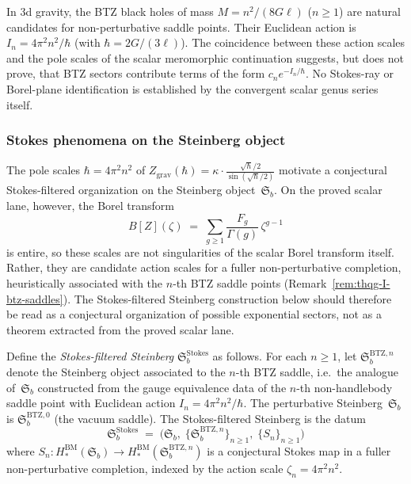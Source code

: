 \begin{remark}
\label{rem:thqg-I-btz-saddles}
In 3d gravity, the BTZ black holes of mass $M = n^2/(8G\ell)$ ($n \geq 1$) are natural candidates for non-perturbative saddle points. Their Euclidean action is $I_n = 4\pi^2 n^2 / \hbar$ (with $\hbar = 2G/(3\ell)$). The coincidence between these action scales and the pole scales of the scalar meromorphic continuation suggests, but does not prove, that BTZ sectors contribute terms of the form $c_n e^{-I_n/\hbar}$. No Stokes-ray or Borel-plane identification is established by the convergent scalar genus series itself.
\end{remark}

\providecommand{\SteinbergB}{\mathfrak{S}_b}

\subsubsection{Stokes phenomena on the Steinberg object}

The pole scales $\hbar = 4\pi^2 n^2$ of
$Z_{\mathrm{grav}}(\hbar) = \kappa \cdot \frac{\sqrt{\hbar}/2}{\sin(\sqrt{\hbar}/2)}$
motivate a conjectural Stokes-filtered organization on the
Steinberg object~$\SteinbergB$. On the proved scalar lane, however,
the Borel transform
\[
B[Z](\zeta) \;=\; \sum_{g \geq 1} \frac{F_g}{\Gamma(g)}\,\zeta^{g-1}
\]
is entire, so these scales are not singularities of the scalar Borel
transform itself. Rather, they are candidate action scales for a
fuller non-perturbative completion, heuristically associated with the
$n$-th BTZ saddle points (Remark~\ref{rem:thqg-I-btz-saddles}).
The Stokes-filtered Steinberg construction below should therefore be
read as a conjectural organization of possible exponential sectors,
not as a theorem extracted from the proved scalar lane.

\begin{construction}
Define the \emph{Stokes-filtered Steinberg} $\SteinbergB^{\mathrm{Stokes}}$ as follows. For each $n \geq 1$, let $\SteinbergB^{\mathrm{BTZ},n}$ denote the Steinberg object associated to the $n$-th BTZ saddle, i.e.\ the analogue of~$\SteinbergB$ constructed from the gauge equivalence data of the $n$-th non-handlebody saddle point with Euclidean action $I_n = 4\pi^2 n^2 / \hbar$. The perturbative Steinberg~$\SteinbergB$ is $\SteinbergB^{\mathrm{BTZ},0}$ (the vacuum saddle). The Stokes-filtered Steinberg is the datum
\[
\SteinbergB^{\mathrm{Stokes}} \;=\; \bigl(\SteinbergB,\;\{\SteinbergB^{\mathrm{BTZ},n}\}_{n \geq 1},\;\{S_n\}_{n \geq 1}\bigr)
\]
where $S_n \colon H_*^{\mathrm{BM}}(\SteinbergB) \to H_*^{\mathrm{BM}}(\SteinbergB^{\mathrm{BTZ},n})$ is a conjectural Stokes map in a fuller non-perturbative completion, indexed by the action scale $\zeta_n = 4\pi^2 n^2$.
\end{construction}

